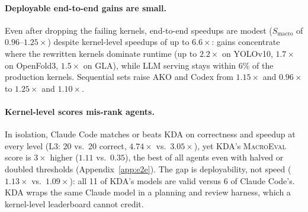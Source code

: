\paragraph{Deployable end-to-end gains are small.}
Even after dropping the failing kernels, end-to-end speedups are modest ($S_{\mathrm{macro}}$ of $0.96$--$1.25\times$) despite kernel-level speedups of up to $6.6\times$: gains concentrate where the rewritten kernels dominate runtime (up to $2.2\times$ on YOLOv10, $1.7\times$ on OpenFold3, $1.5\times$ on GLA), while LLM serving stays within 6\% of the production kernels.
Sequential sets raise AKO and Codex from $1.15\times$ and $0.96\times$ to $1.25\times$ and $1.10\times$.

\paragraph{Kernel-level scores mis-rank agents.}
In isolation, Claude Code matches or beats KDA on correctness and speedup at every level (L3: 20 vs.\ 20 correct, $4.74\times$ vs.\ $3.05\times$), yet KDA's \textsc{MacroEval} score is $3\times$ higher ($1.11$ vs.\ $0.35$), the best of all agents even with halved or doubled thresholds (Appendix~\ref{app:e2e}).
The gap is deployability, not speed ($1.13\times$ vs.\ $1.09\times$): all 11 of KDA's models are valid versus 6 of Claude Code's. KDA wraps the same Claude model in a planning and review harness, which a kernel-level leaderboard cannot credit.

